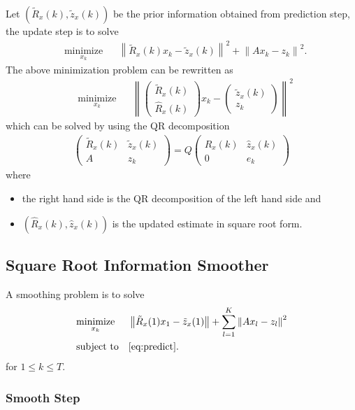\documentclass[microtype]{gtpart}     %
\theoremstyle{definition}
\newcommand{\norm}[1]{\left\lVert#1\right\rVert}
\begin{document}
Let $(\tilde{R}_x(k), \tilde{z}_x(k))$ be the prior information obtained from prediction step, 
the update step is to solve
\begin{align*}
	& \underset{x_k}{\text{minimize}} & &\norm{\tilde{R}_x(k)x_k - \tilde{z}_x(k)}^2 + \norm{Ax_k - z_k}^2.
\end{align*}
The above minimization problem can be rewritten as
\begin{align*}
	& \underset{x_k}{\text{minimize}} & &\norm{
	\begin{pmatrix}
	\tilde{R}_x(k) \\ \hat{R}_x(k)
	\end{pmatrix}x_k - 
	\begin{pmatrix}
	\tilde{z}_x(k) \\  z_k
	\end{pmatrix}}^2
\end{align*}
which can be solved by using the QR decomposition
\begin{align*}
	\begin{pmatrix}
		\tilde{R}_x(k) &\tilde{z}_x(k) \\ 
		A &z_k
	\end{pmatrix} = Q
	\begin{pmatrix}
		\hat{R}_x(k) &\hat{z}_x(k) \\
		0 &e_k
	\end{pmatrix}
\end{align*}
where
\begin{itemize}
	\item the right hand side is the QR decomposition of the left hand side and
	\item $(\hat{R}_x(k), \hat{z}_x(k))$ is the updated estimate in square root form.
\end{itemize}

\subsection{Square Root Information Smoother}

A smoothing problem is to solve
\begin{align*}
& \underset{x_k}{\text{minimize}} & & \norm{\tilde{R}_x(1)x_1 - \tilde{z}_x(1)} + \sum_{l=1}^{K}\norm{Ax_l - z_l}^2 \\
& \text{subject to} & & \autoref{eq:predict}.
\end{align*}
for $1\leq k \leq T$.

\subsubsection{Smooth Step}
\end{document}
